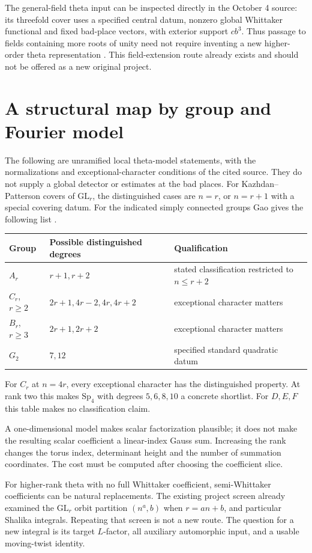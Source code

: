 \documentclass[11pt]{article}
\newcommand{\toprule}{\hline}
\newcommand{\midrule}{\hline}
\newcommand{\bottomrule}{\hline}
\newcommand{\GL}{\mathrm{GL}}
\newcommand{\Sp}{\mathrm{Sp}}
\begin{document}
The general-field theta input can be inspected directly in the October 4
source: its threefold cover uses a specified central datum, nonzero global
Whittaker functional and fixed bad-place vectors, with exterior support
$c b^3$. Thus passage to fields containing more roots of unity need not
require inventing a new higher-order theta representation
\cite{Primitive}. This field-extension route already exists and should
not be offered as a new original project.

\section{A structural map by group and Fourier model}

The following are unramified local theta-model statements, with the
normalizations and exceptional-character conditions of the cited source.
They do not supply a global detector or estimates at the bad places.
For Kazhdan--Patterson covers of $\GL_r$, the distinguished cases are
$n=r$, or $n=r+1$ with a special covering datum.
For the indicated simply connected groups Gao gives the following list
\cite[Theorems 1.1, 1.2, 5.3, 6.2, 7.1]{Gao}.
\begin{center}
\begin{tabular}{lll}
\toprule
Group & Possible distinguished degrees & Qualification\\
\midrule
$A_r$ & $r+1,r+2$ & stated classification restricted to $n\le r+2$\\
$C_r$, $r\ge2$ & $2r+1,4r-2,4r,4r+2$ & exceptional character matters\\
$B_r$, $r\ge3$ & $2r+1,2r+2$ & exceptional character matters\\
$G_2$ & $7,12$ & specified standard quadratic datum\\
\bottomrule
\end{tabular}
\end{center}
For $C_r$ at $n=4r$, every exceptional character has the distinguished
property. At rank two this makes $\Sp_4$ with degrees $5,6,8,10$
a concrete shortlist. For $D,E,F$ this table makes no classification claim.

A one-dimensional model makes scalar factorization plausible; it does
not make the resulting scalar coefficient a linear-index Gauss sum.
Increasing the rank changes the torus index, determinant height and
the number of summation coordinates. The cost must be computed after
choosing the coefficient slice.

For higher-rank theta with no full Whittaker coefficient, semi-Whittaker
coefficients can be natural replacements. The existing project screen
already examined the $\GL_r$ orbit partition $(n^a,b)$ when $r=an+b$,
and particular Shalika integrals. Repeating that screen is not a new route.
The question for a new integral is its target $L$-factor, all auxiliary
automorphic input, and a usable moving-twist identity.
\end{document}
